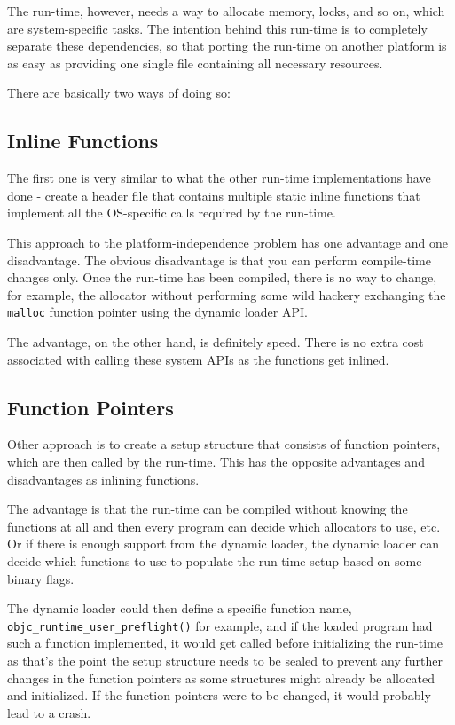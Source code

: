 The run-time, however, needs a way to allocate memory, locks, and so on, which are system-specific tasks. The intention behind this run-time is to completely separate these dependencies, so that porting the run-time on another platform is as easy as providing one single file containing all necessary resources.

There are basically two ways of doing so:

\subsection{Inline Functions}
The first one is very similar to what the other run-time implementations have done - create a header file that contains multiple static inline functions that implement all the OS-specific calls required by the run-time.

This approach to the platform-independence problem has one advantage and one disadvantage. The obvious disadvantage is that you can perform compile-time changes only. Once the run-time has been compiled, there is no way to change, for example, the allocator without performing some wild hackery exchanging the \verb=malloc= function pointer using the dynamic loader API.

The advantage, on the other hand, is definitely speed. There is no extra cost associated with calling these system APIs as the functions get inlined.

\subsection{Function Pointers}

Other approach is to create a setup structure that consists of function pointers, which are then called by the run-time. This has the opposite advantages and disadvantages as inlining functions.

The advantage is that the run-time can be compiled without knowing the functions at all and then every program can decide which allocators to use, etc. Or if there is enough support from the dynamic loader, the dynamic loader can decide which functions to use to populate the run-time setup based on some binary flags.

The dynamic loader could then define a specific function name, \newline{}\verb=objc_runtime_user_preflight()= for example, and if the loaded program had such a function implemented, it would get called before initializing the run-time as that's the point the setup structure needs to be sealed to prevent any further changes in the function pointers as some structures might already be allocated and initialized. If the function pointers were to be changed, it would probably lead to a crash.

